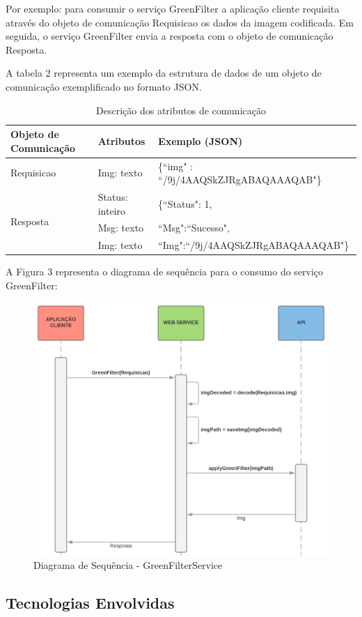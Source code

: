 \documentclass[12pt]{article}
\begin{document}
Por exemplo: para consumir o serviço GreenFilter a aplicação cliente requisita através do objeto de comunicação Requisicao os dados da imagem codificada. Em seguida, o serviço GreenFilter envia a resposta com o objeto de comunicação Resposta.

A tabela 2 representa um exemplo da estrutura de dados de um objeto de
comunicação exemplificado no formato JSON.

\begin{table}[ht]
	\centering
	\caption{Descrição dos atributos de comunicação}
	\label{tab:Table2}
	\smallskip
	\begin{tabular}{ |l|l|l| }
		\hline
		Objeto de Comunicação & Atributos & Exemplo (JSON) \\ \hline
		Requisicao & Img: texto & \{“img" : “/9j/4AAQSkZJRgABAQAAAQAB"\} \\ \hline
		\multirow{3}{*}{Resposta} & Status: inteiro & \{“Status": 1, \\
		& Msg: texto & “Msg":“Sucesso", \\
		& Img: texto & “Img":“/9j/4AAQSkZJRgABAQAAAQAB"\} \\
		\hline
	\end{tabular}
\end{table}

A Figura 3 representa o diagrama de sequência para o consumo do serviço GreenFilter:

\begin{figure}[ht]
	\centering
	\includegraphics[width=.7\textwidth]{ds-green-filter2.png}
	\caption{Diagrama de Sequência - GreenFilterService}
	\label{fig:Figura3}
\end{figure}

\subsection{Tecnologias Envolvidas}
\end{document}
